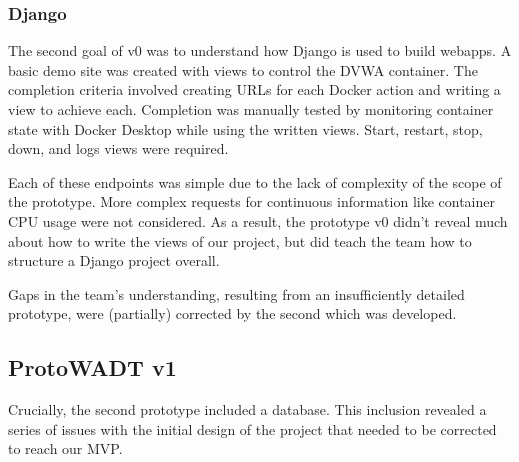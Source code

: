 \documentclass[../design-document.tex]{subfiles}
\begin{document}
\subsubsection{Django}
The second goal of v0 was to understand how Django is used to build webapps. A basic demo site was created with views to control the DVWA container. The completion criteria involved creating URLs for each Docker action and writing a view to achieve each. Completion was manually tested by monitoring container state with Docker Desktop while using the written views. Start, restart, stop, down, and logs views were required.

Each of these endpoints was simple due to the lack of complexity of the scope of the prototype. More complex requests for continuous information like container CPU usage were not considered. As a result, the prototype v0 didn't reveal much about how to write the views of our project, but did teach the team how to structure a Django project overall.

Gaps in the team's understanding, resulting from an insufficiently detailed prototype, were (partially) corrected by the second which was developed.

\subsection{ProtoWADT v1}
Crucially, the second prototype included a database. This inclusion revealed a series of issues with the initial design of the project that needed to be corrected to reach our MVP.
\end{document}
